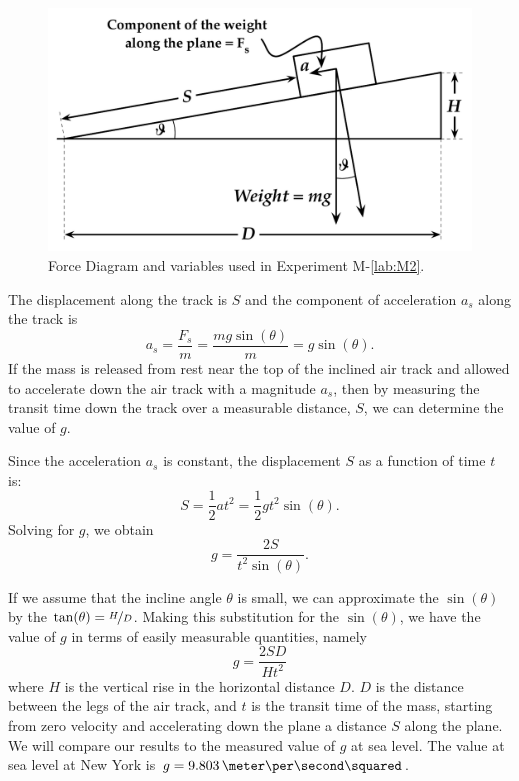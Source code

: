 \begin{figure}
  \begin{center}  
    \includegraphics[width=5.5in]{Experiment02Figures/Figure01.pdf}
  \end{center}
  \caption{Force Diagram and variables used in Experiment M-\ref{lab:M2}.}
  \label{M02Fig01}  %
\end{figure}

The displacement along the track is $S$ and the component of acceleration $a_s$ along the track is
\[
a_s = \frac{F_s}{m} = \frac{m g \sin(\theta)}{m} =  g \sin(\theta).
\]
If the mass is released from rest near the top of the inclined air track and allowed to accelerate down the air track with a magnitude $a_s$, then by measuring the transit time down the track over a measurable distance, $S$, we can determine the value of $g$.

Since the acceleration $a_s$ is constant, the displacement $S$ as a function of time $t$ is:
\[
  S = \frac{1}{2} a t^2 = \frac{1}{2} g t^{2} \sin(\theta).
\]
Solving for $g$, we obtain
\begin{equation}
  g = \frac{2 S}{t^2 \sin(\theta)}.
\end{equation}

If we assume that the incline angle $\theta$ is small, we can approximate the $\sin(\theta)$ by the $\tan(\theta) = \nicefrac{H}{D}$.
Making this substitution for the $\sin(\theta)$, we have the value of $g$ in terms of easily measurable quantities, namely
\begin{equation}
  \label{eq:M02gvalue}
  g = \frac{2 S D}{H t^2}
\end{equation}
where $H$ is the vertical rise in the horizontal distance $D$.  $D$ is the distance between the legs of the air track, and $t$ is the transit time of the mass, starting from zero velocity and accelerating down the plane a distance $S$ along the plane.
We will compare our results to the measured value of $g$ at sea level.  The value at sea level at New York is $g = 9.803\,\meter\per\second\squared$.

